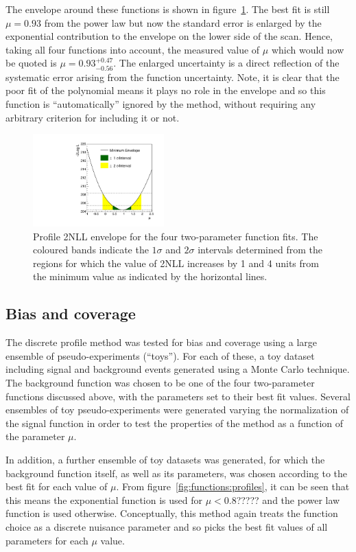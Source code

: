The envelope around these functions is shown in
figure~\ref{fig:functions:envelope}.
The best fit is still $\mu=0.93$ from the power law
but now the standard error is enlarged by the exponential contribution to the
envelope on the lower side of the scan. Hence, taking all four functions into
account, the measured value of $\mu$ which would now be quoted is 
$\mu = 0.93_{-0.56}^{+0.47}$. The enlarged uncertainty is a direct reflection of the
systematic error arising from the function uncertainty. Note,
it is clear that the poor fit of the polynomial
means it plays no role in the envelope and so this function is 
``automatically'' ignored by the method,
without requiring any arbitrary criterion for
including it or not.
%
\begin{figure}[tbp]
\centering
\includegraphics[width=0.45\textwidth]{functions/Envelope.pdf}
\caption{Profile 2NLL envelope for the four two-parameter function fits.
The coloured bands indicate the $1\sigma$ and $2\sigma$ intervals determined from the regions 
for which the value of 2NLL increases by 1 and 4 units from the minimum value as indicated by the horizontal lines.}
\label{fig:functions:envelope}
\end{figure}


\subsection{Bias and coverage}
\label{sec:functions:coverage}

The discrete profile method was tested for bias and coverage 
using a large ensemble of
pseudo-experiments (``toys''). For each of these, a toy
dataset including signal and background events generated using a Monte Carlo technique. 
The background function was chosen to be one of the four two-parameter functions discussed above, with
the parameters set to their best fit values. Several ensembles of toy pseudo-experiments were 
generated varying the normalization of the signal function in order to test the properties 
of the method as a function of the parameter $\mu$.  

In addition, a further ensemble of toy datasets was generated, for which the
background function itself, as well as its parameters, was chosen according to
the best fit for each value of $\mu$. From figure~\ref{fig:functions:profiles},
it can be seen that this means the exponential function is used for $\mu<0.8$?????
and the power law function is used otherwise. Conceptually, this method again
treats the function choice as a discrete nuisance parameter and so picks the
best fit values of all parameters for each $\mu$ value.

